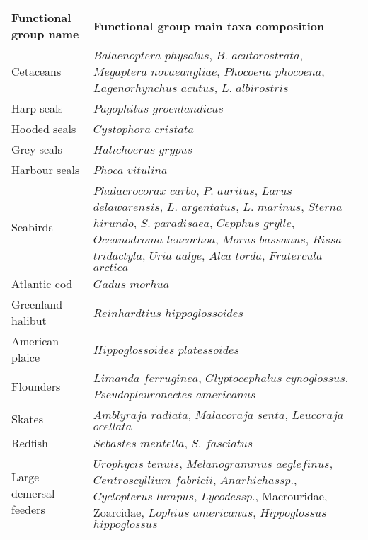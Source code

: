 \documentclass[letterpaper]{article}
\begin{document}
\newpage
\begin{table}[h!]
    \centering
    \small
    \begin{tabularx}{1\textwidth}{|s|b|}
        \hline
        Functional group name   & Functional group main taxa composition    \\
        \hline \hline
        Cetaceans                          & $Balaenoptera$ $physalus$, $B.$ $acutorostrata$, $Megaptera$ $novaeangliae$, $Phocoena$ $phocoena$, $Lagenorhynchus$ $acutus$, $L.$ $albirostris$  \\
        \hline
        Harp seals                         & $Pagophilus$ $groenlandicus$   \\
        \hline
        Hooded seals                       & $Cystophora$ $cristata$    \\
        \hline
        Grey seals                         & $Halichoerus$ $grypus$ \\
        \hline
        Harbour seals                      & $Phoca$ $vitulina$ \\
        \hline
        Seabirds                           & $Phalacrocorax$ $carbo$, $P.$ $auritus$, $Larus$ $delawarensis$, $L.$ $argentatus$, $L.$ $marinus$, $Sterna$ $hirundo$, $S.$ $paradisaea$, $Cepphus$ $grylle$, $Oceanodroma$ $leucorhoa$, $Morus$ $bassanus$, $Rissa$ $tridactyla$, $Uria$ $aalge$, $Alca$ $torda$, $Fratercula$ $arctica$ \\
        \hline
        Atlantic cod                       & $Gadus$ $morhua$   \\
        \hline
        Greenland halibut                  & $Reinhardtius$ $hippoglossoides$   \\
        \hline
        American plaice                    & $Hippoglossoides$ $platessoides$   \\
        \hline
        Flounders                          & $Limanda$ $ferruginea$, $Glyptocephalus$ $cynoglossus$, $Pseudopleuronectes$ $americanus$  \\
        \hline
        Skates                             & $Amblyraja$ $radiata$, $Malacoraja$ $senta$, $Leucoraja$ $ocellata$    \\
        \hline
        Redfish                            & $Sebastes$ $mentella$, $S.$ $fasciatus$    \\
        \hline
        Large demersal feeders             & $Urophycis$ $tenuis$, $Melanogrammus$ $aeglefinus$, $Centroscyllium$ $fabricii$, $Anarhichas sp.$, $Cyclopterus$ $lumpus$, $Lycodes sp.$, Macrouridae, Zoarcidae, $Lophius$ $americanus$, $Hippoglossus$ $hippoglossus$    \\

\end{tabularx}
\end{table}
\end{document}
